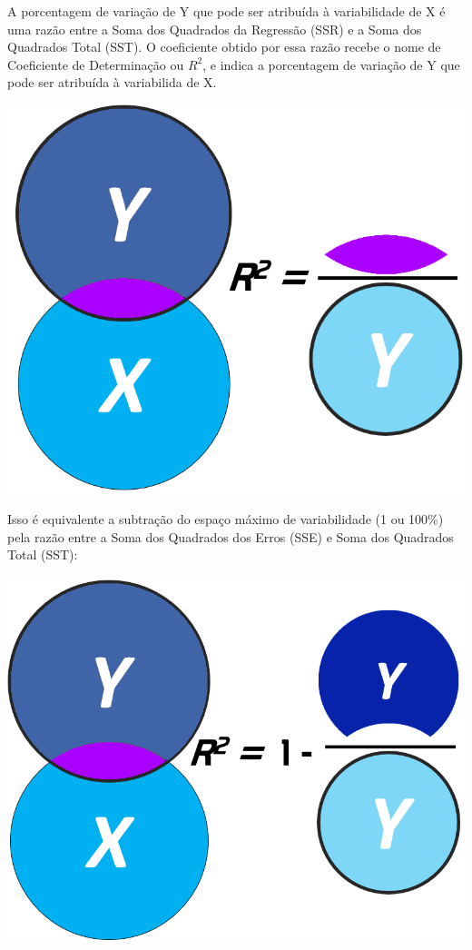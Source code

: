 \documentclass[
]{book}
\begin{document}
A porcentagem de variação de Y que pode ser atribuída à variabilidade de
X é uma razão entre a Soma dos Quadrados da Regressão (SSR) e a Soma dos
Quadrados Total (SST). O coeficiente obtido por essa razão recebe o nome
de Coeficiente de Determinação ou \(R^2\), e indica a porcentagem de
variação de Y que pode ser atribuída à variabilida de X.

\includegraphics{./img/cap_regr2.png}

Isso é equivalente a subtração do espaço máximo de variabilidade (1 ou
100\%) pela razão entre a Soma dos Quadrados dos Erros (SSE) e Soma dos
Quadrados Total (SST):

\includegraphics{./img/cap_reg_r21.png}
\end{document}
